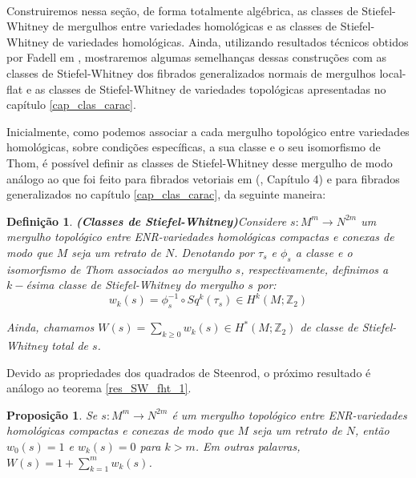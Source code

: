 \documentclass[12pt,oneside]{book} %
\newtheorem{defi}   {\hspace{0.5cm}Defini\c c\~ao}[chapter]
\newtheorem{prop}   {\hspace{0.5cm}Proposi\c c\~ao}[chapter]
\newcommand{\ds}{\displaystyle}
\newcommand{\Z}{\mathbb{Z}}
\begin{document}
\

\par Construiremos nessa seção, de forma totalmente algébrica, as classes de Stiefel-Whitney de mergulhos entre variedades homológicas e as classes de Stiefel-Whitney de variedades homológicas. Ainda, utilizando resultados técnicos obtidos por Fadell em \cite{fadell_1}, mostraremos algumas semelhanças dessas construções com as classes de Stiefel-Whitney dos fibrados generalizados normais de mergulhos local-flat e as classes de Stiefel-Whitney de variedades topológicas apresentadas no capítulo \ref{cap_clas_carac}.

\par Inicialmente, como podemos associar a cada mergulho topológico entre variedades homológicas, sobre condições específicas, a sua classe e o seu isomorfismo de Thom, é possível definir as classes de Stiefel-Whitney desse mergulho de modo análogo ao que foi feito para fibrados vetoriais em (\cite{milnor_1}, Capítulo 4) e para fibrados generalizados no capítulo \ref{cap_clas_carac}, da seguinte maneira:

\begin{defi}{\bf (Classes de Stiefel-Whitney)}\label{defi_SW_merg}
Considere $s:M^{m}\to N^{2m}$ um mergulho topológico entre ENR-variedades homológicas compactas e conexas de modo que $M$ seja um retrato de $N$. Denotando por $\tau_{s}$ e $\phi_{s}$ a classe e o isomorfismo de Thom associados ao mergulho $s$, respectivamente, definimos a $k-$ésima classe de Stiefel-Whitney do mergulho $s$ por:
	$$ w_{k}(s)=\phi_{s}^{-1}\circ Sq^{k}(\tau_{s})\in H^{k}(M;\Z_{2}) $$

\par Ainda, chamamos $W(s)=\ds\sum_{k\geq 0}w_{k}(s)\in H^{*}(M;\Z_{2})$ de classe de Stiefel-Whitney total de $s$.
\end{defi}

\par Devido as propriedades dos quadrados de Steenrod, o próximo resultado é análogo ao teorema \ref{res_SW_fht_1}.

\begin{prop}
	Se $s:M^{m}\to N^{2m}$ é um mergulho topológico entre ENR-variedades homológicas compactas e conexas de modo que $M$ seja um retrato de $N$, então $w_{0}(s)=1$ e $w_{k}(s)=0$ para $k>m$. Em outras palavras, $W(s)=1+\ds\sum_{k=1}^{m}w_{k}(s)$.
\end{prop}
\end{document}
